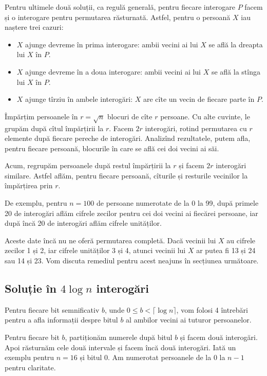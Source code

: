 \documentclass[../main.tex]{subfiles}
\begin{document}
Pentru ultimele două soluții, ca regulă generală, pentru fiecare interogare $P$ facem și o interogare pentru permutarea răsturnată. Astfel, pentru o persoană $X$ iau naștere trei cazuri:

\begin{itemize}
  \item $X$ ajunge devreme în prima interogare: ambii vecini ai lui $X$ se află la dreapta lui $X$ în $P$.
  \item $X$ ajunge devreme în a doua interogare: ambii vecini ai lui $X$ se află la stînga lui $X$ în $P$.
  \item $X$ ajunge tîrziu în ambele interogări: $X$ are cîte un vecin de fiecare parte în $P$.
\end{itemize}

Împărțim persoanele în $r = \sqrt{n}$ blocuri de cîte $r$ persoane. Cu alte cuvinte, le grupăm după cîtul împărțirii la $r$. Facem $2r$ interogări, rotind permutarea cu $r$ elemente după fiecare pereche de interogări. Analizînd rezultatele, putem afla, pentru fiecare persoană, blocurile în care se află cei doi vecini ai săi.

Acum, regrupăm persoanele după restul împărțirii la $r$ și facem $2r$ interogări similare. Astfel aflăm, pentru fiecare persoană, cîturile și resturile vecinilor la împărțirea prin $r$.

De exemplu, pentru $n = 100$ de persoane numerotate de la 0 la 99, după primele 20 de interogări aflăm cifrele zecilor pentru cei doi vecini ai fiecărei persoane, iar după încă 20 de interogări aflăm cifrele unităților.

Aceste date încă nu ne oferă permutarea completă. Dacă vecinii lui $X$ au cifrele zecilor 1 și 2, iar cifrele unităților 3 și 4, atunci vecinii lui $X$ ar putea fi 13 și 24 sau 14 și 23. Vom discuta remediul pentru acest neajuns în secțiunea următoare.

\subsection{Soluție în \texorpdfstring{$4 \log n$}{4 log n} interogări}

Pentru fiecare bit semnificativ $b$, unde $0 \leq b < \lceil \log n \rceil$, vom folosi 4 întrebări pentru a afla informații despre bitul $b$ al ambilor vecini ai tuturor persoanelor.

Pentru fiecare bit $b$, partiționăm numerele după bitul $b$ și facem două interogări. Apoi răsturnăm cele două intervale și facem încă două interogări. Iată un exemplu pentru $n = 16$ și bitul 0. Am numerotat persoanele de la 0 la $n-1$ pentru claritate.
\end{document}
